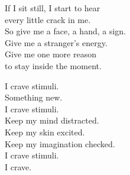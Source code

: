 \begin{lyrics}
If I sit still, I start to hear\\
every little crack in me.\\
So give me a face, a hand, a sign.\\
Give me a stranger's energy.\\
Give me one more reason\\
to stay inside the moment.

I crave stimuli.\\
Something new.\\
I crave stimuli.\\
Keep my mind distracted.\\
Keep my skin excited.\\
Keep my imagination checked.\\
I crave stimuli.\\
I crave.
\end{lyrics}

